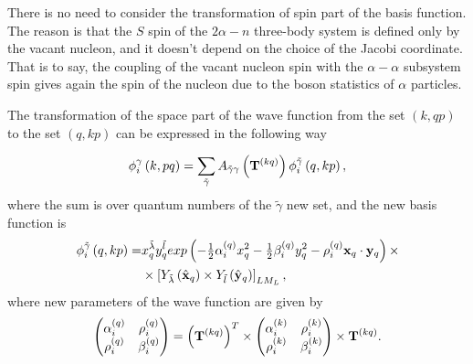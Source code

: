 \documentclass[12pt,a4paper,twoside]{article}
\begin{document}
There is no need to consider the transformation of spin part of the basis function. The reason is that the $S$ spin of the $2\alpha-n$ three-body system is defined only by the vacant nucleon, and it doesn't depend on the choice of the Jacobi coordinate. That is to say, the coupling of the vacant nucleon spin with the $\alpha-\alpha$ subsystem spin gives again the spin of the nucleon due to the boson statistics of  $\alpha$ particles.  

The transformation of the space part of the wave function from the set $ \left(k, qp \right) $ to the set $ \left(q, kp \right) $ can be expressed in the following way

  \begin{equation}
 \label{transformbasisfunction}
 \phi_{i}^{\gamma}\left(k, pq \right) = \sum_{\tilde{\gamma}} A_{\tilde{\gamma}\gamma}\left( {\bf T}^{(kq)} \right)
  \phi_{i}^{\tilde{\gamma} } \left(q, kp \right) ,
 \end{equation}
where the sum is over quantum numbers of the $ \tilde {\gamma} $ new set, and the new basis function is
\begin{align}
\phi_{i}^{\tilde{\gamma} } \left(q, kp \right)  =  &
 x_{q}^{\tilde{\lambda}} y_{q}^{\tilde{l}} exp\left(- \tfrac{1}{2} \alpha^{(q)}_{i} x_{q}^{2} - \tfrac{1}{2} \beta^{(q)}_{i}  y_{q}^{2} - \rho^{(q)}_i {\bf x}_{q} \cdot {\bf y}_{q}  \right) 
\times  \nonumber \\ 
&\times  \left[ Y_{\tilde{\lambda}} \left(  \hat{ \bf x}_q \right) \times Y_{\tilde{l}} \left( \hat{\bf y}_q \right) \right]_{LM_L},
\label{newBasis}
\end{align}
where new parameters of the wave function are given by
\begin{align}
\begin{pmatrix}
\alpha_i^{(q)} & \rho_i^{(q)} \\ 
\rho_i^{(q)} & \beta_i^{(q)}
\end{pmatrix}  = \left( {\bf T}^{(kq)} \right)^{T} \times 
\begin{pmatrix}
\alpha_i^{(k)} & \rho_i^{(k)} \\ 
\rho_i^{(k)} & \beta_i^{(k)}
\end{pmatrix} \times  {\bf T}^{(kq)}.
\end{align}
\end{document}
